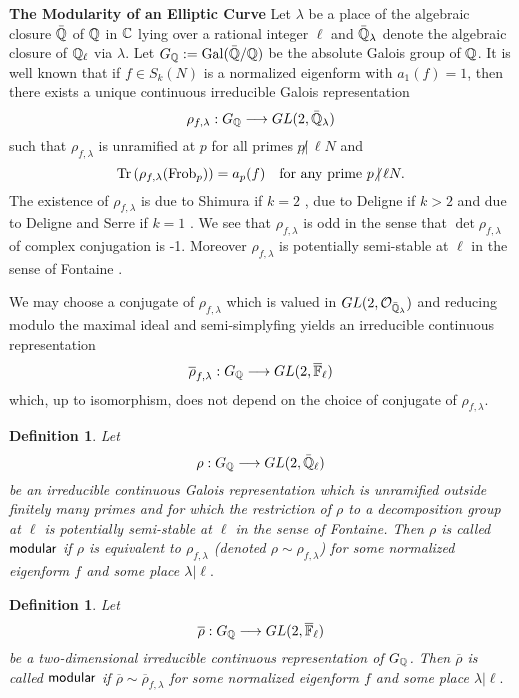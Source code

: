 \documentclass[11pt]{amsart}
\newtheorem{definition}[theorem]{Definition}
\begin{document}
\begin{section}{{\bf The Modularity of an Elliptic Curve}}
\vskip 2mm
Let $\lambda$ be a place of the algebraic closure $\bar {\mathbb Q}$ of $\mathbb Q$ in $\mathbb C$ lying over
a rational integer $\ell$ and ${\bar {\mathbb Q}}_\lambda$ denote the algebraic closure of $\mathbb Q_\ell$
via $\lambda$. Let $G_\mathbb Q:={\rm Gal}({\bar {\mathbb Q}}/\mathbb Q)$ be the absolute Galois group of $\mathbb Q$.
It is well known that if $f\in S_k (N)$ is a normalized eigenform with
$a_1(f)=1$, then there exists a unique continuous irreducible Galois representation
\begin{equation*}
  \rho_{f,\lambda}:G_\mathbb Q\longrightarrow GL(2,{\bar {\mathbb Q}}_\lambda)
\end{equation*}
such that $\rho_{f,\lambda}$ is unramified at $p$ for all primes $p\!\!\not| \,\ell N$ and
\begin{equation*}
  {\rm Tr}\left(\rho_{f,\lambda}({\rm Frob}_p)\right)= a_p(f)\quad {\rm for\ any\ prime}\
p\!\!\not| \, \ell N.
\end{equation*}
The existence of $\rho_{f,\lambda}$ is due to Shimura if $k=2$ \cite{Sh2}, due to Deligne if
$k>2$ \cite{De} and due to Deligne and Serre if $k=1$ \cite{D-S}. We see that $\rho_{f,\lambda}$ is
odd in the sense that $\det \rho_{f,\lambda}$ of complex conjugation is -1. Moreover
$\rho_{f,\lambda}$ is potentially semi-stable at $\ell$ in the sense of Fontaine \cite{F-M}.

\vskip 3mm
We may choose a conjugate of $\rho_{f,\lambda}$ which is valued in
$GL(2,{\mathcal O}_{\bar{\mathbb Q}_\lambda})$ and reducing modulo the maximal ideal and
semi-simplyfing yields an irreducible continuous representation
\begin{equation*}
{\overline \rho}_{f,\lambda}:G_\mathbb Q\longrightarrow GL(2,\overline{\mathbb F}_\ell)
\end{equation*}
which, up to isomorphism, does not depend on the choice of conjugate of $\rho_{f,\lambda}$.

\begin{definition}\label{def:1.1}
Let
$$\rho: G_\mathbb Q\longrightarrow GL(2,\bar{\mathbb Q}_\ell)$$
be an irreducible continuous Galois representation which is unramified outside finitely
many primes and for which the restriction of $\rho$ to a decomposition group at $\ell$ is
potentially semi-stable at $\ell$ in the sense of Fontaine. Then $\rho$ is called
${\sf modular}$ if $\rho$ is equivalent to $\rho_{f,\lambda}$
(denoted $\rho\sim \rho_{f,\lambda}$) for some normalized eigenform $f$ and some place
$\lambda | \ell.$
\end{definition}

\begin{definition}\label{1.2}
Let
$${\overline\rho}: G_\mathbb Q\longrightarrow GL(2,\overline{\mathbb F}_\ell)$$
be a two-dimensional irreducible continuous representation of $G_\mathbb Q$.
Then ${\overline\rho}$ is called
${\sf modular}$ if ${\overline\rho}\sim {\overline\rho}_{f,\lambda}$
for some normalized eigenform $f$ and some place $\lambda | \ell.$
\end{definition}


\end{section}
\end{document}
